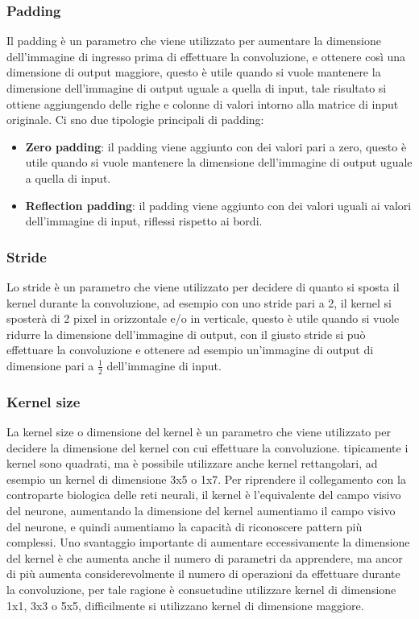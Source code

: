 \subsubsection{Padding}
Il padding è un parametro che viene utilizzato per aumentare la dimensione dell'immagine di ingresso prima di effettuare la convoluzione,
e ottenere così una dimensione di output maggiore, questo è utile quando si vuole mantenere la dimensione dell'immagine di output uguale a quella di input,
tale risultato si ottiene aggiungendo delle righe e colonne di valori intorno alla matrice di input originale.
Ci sno due tipologie principali di padding:
\begin{itemize}
    \item \textbf{Zero padding}: il padding viene aggiunto con dei valori pari a zero, questo è utile quando 
    si vuole mantenere la dimensione dell'immagine di output uguale a quella di input.
    \item \textbf{Reflection padding}: il padding viene aggiunto con dei valori uguali ai valori dell'immagine di input, riflessi rispetto ai bordi.
\end{itemize}

\subsubsection{Stride}
Lo stride è un parametro che viene utilizzato per decidere di quanto si sposta il kernel durante la convoluzione,
ad esempio con uno stride pari a 2, il kernel si sposterà di 2 pixel in orizzontale e/o in verticale, questo è utile quando si vuole ridurre la dimensione dell'immagine di output,
con il giusto stride si può effettuare la convoluzione e ottenere ad esempio un'immagine di output di dimensione pari a $\frac{1}{2}$ dell'immagine di input.

\subsubsection{Kernel size}
La kernel size o dimensione del kernel è un parametro che viene utilizzato per decidere la dimensione del kernel con cui effettuare la convoluzione.
tipicamente i kernel sono quadrati, ma è possibile utilizzare anche kernel rettangolari, ad esempio un kernel di dimensione 3x5 o 1x7.
Per riprendere il collegamento con la controparte biologica delle reti neurali, il kernel è l'equivalente del campo visivo del neurone,
aumentando la dimensione del kernel aumentiamo il campo visivo del neurone, e quindi aumentiamo la capacità di riconoscere pattern più complessi.
Uno svantaggio importante di aumentare eccessivamente la dimensione del kernel è che aumenta anche il numero di parametri da apprendere,
ma ancor di più aumenta considerevolmente il numero di operazioni da effettuare durante la convoluzione, per tale ragione è consuetudine
utilizzare kernel di dimensione 1x1, 3x3 o 5x5, difficilmente si utilizzano kernel di dimensione maggiore.

